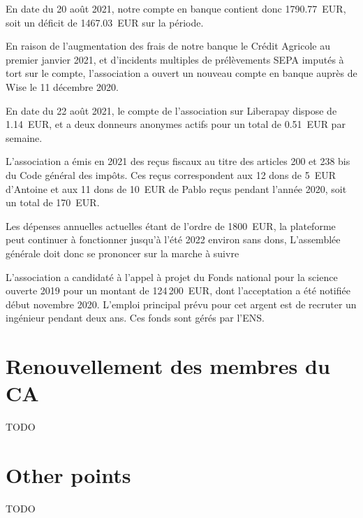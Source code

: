 \documentclass[a4paper]{article}
\begin{document}
En date du 20 août 2021, notre compte en banque contient donc 1790.77~EUR, soit
un déficit de 1467.03~EUR sur la période.

En raison de l'augmentation des frais de notre banque le Crédit Agricole au
premier janvier 2021, et d'incidents multiples de prélèvements SEPA imputés à
tort sur le compte, l'association a ouvert un nouveau compte en banque auprès de
Wise le 11 décembre 2020.

En date du 22 août 2021, le compte de l'association sur Liberapay dispose de
1.14~EUR, et a deux donneurs anonymes actifs pour un total de 0.51~EUR par
semaine.

L'association a émis en 2021 des reçus fiscaux au titre des articles 200 et 238
bis du Code général des impôts. Ces reçus correspondent aux 12 dons de 5~EUR
d'Antoine et aux 11 dons de 10~EUR de Pablo reçus pendant l'année 2020, soit un total de 170~EUR.

Les dépenses annuelles actuelles étant de l'ordre de 1800~EUR, la plateforme
peut continuer à fonctionner jusqu'à l'été 2022 environ sans dons, L'assemblée
générale doit donc se prononcer sur la marche à suivre

L'association a candidaté à l'appel à projet du Fonds national pour la science
ouverte 2019 pour un montant de 124\,200~EUR, dont l'acceptation a été notifiée
début novembre 2020. L'emploi principal prévu pour cet argent est de recruter un
ingénieur pendant deux ans. Ces fonds sont gérés par l'ENS.

\section{Renouvellement des membres du CA}
TODO

\section{Other points}
TODO
\end{document}
